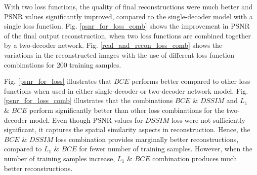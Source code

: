 
With two loss functions, the quality of final reconstructions were much better and PSNR values significantly improved, compared to the single-decoder model with a single loss function. Fig. \ref{psnr_for_loss_comb} shows the improvement in PSNR of the final output reconstruction, when two loss functions are combined together by a two-decoder network. Fig. \ref{real_and_recon_loss_comb} shows the variations in the reconstructed images with the use of different loss function combinations for 200 training samples.

Fig. \ref{psnr_for_loss} illustrates that $BCE$ performs better compared to other loss functions when used in either single-decoder or two-decoder network model. Fig. \ref{psnr_for_loss_comb} illustrates that the combinations $BCE$ \& $DSSIM$ and $L_1$ \& $BCE$ perform significantly better than other loss combinations for the two-decoder model. Even though PSNR values for $DSSIM$ loss were not sufficiently significant, it captures the spatial similarity aspects in reconstruction. Hence, the $BCE$ \& $DSSIM$ loss combination provides marginally better reconstructions, compared to $L_1$ \& $BCE$ for fewer number of training samples. However, when the number of training samples increase, $L_1$ \& $BCE$ combination produces much better reconstructions.

